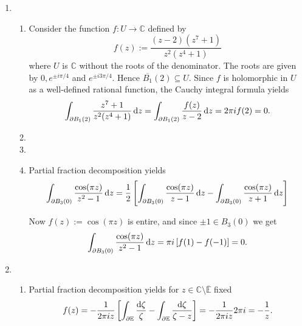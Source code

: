 \begin{enumerate}[label = \textbf{Exercise \arabic*.},wide = 0pt, itemsep=1.5ex]
\begin{proof}
			Using again proposition \ref{prop:zentrierungslemma} we find
			\begin{equation}
				\int_{\partial R}\frac{\d \zeta}{\zeta - z} = 2\pi i.
				\label{eq:int}
			\end{equation}
			Putting (\ref{eq:intg0}) and (\ref{eq:int}) together yields
			\begin{equation}
				0 = \int_{\partial R}g \d \zeta= \int_{\partial R} \frac{f(\zeta)}{\zeta - z} \d \zeta - f(z)\int_{\partial R}\frac{\d \zeta}{\zeta - z}= \int_{\partial R} \frac{f(\zeta)}{\zeta - z} \d \zeta - 2\pi i f(z).
			\end{equation}
		\end{proof}
	\item
		~
		\begin{enumerate}[label = (\roman*),wide = 0pt, itemsep=1.5ex]
			\item Consider the function $f: U \to \mathbb{C}$ defined by
				\begin{equation}
					f(z) := \frac{(z - 2)(z^7 + 1)}{z^2(z^4 + 1)}
				\end{equation}
				\noindent where $U$ is $\mathbb{C}$ without the roots of the denominator. The roots are given by $0,e^{\pm i\pi/4}$ and $e^{\pm i3\pi/4}$. Hence $\overline{B_1}(2) \subseteq U$. Since $f$ is holomorphic in $U$ as a well-defined rational function, the Cauchy integral formula yields
	\begin{equation}
		\int_{\partial B_1(2)}\frac{z^7 + 1}{z^2(z^4 + 1)}\mathop{}\!\mathrm{d} z = \int_{\partial B_1(2)} \frac{f(z)}{z - 2}\mathop{}\!\mathrm{d} z = 2\pi i f(2) = 0.
	\end{equation}
			\item 
			\item
			\item Partial fraction decomposition yields
				\begin{equation}
					\int_{\partial B_3(0)} \frac{\cos(\pi z)}{z^2 - 1}\d z = \frac{1}{2}\sbr{\int_{\partial B_3(0)}\frac{\cos(\pi z)}{z - 1}\d z - \int_{\partial B_3(0)}\frac{\cos(\pi z)}{z + 1}\d z}
				\end{equation}

				Now $f(z) := \cos(\pi z)$ is entire, and since $\pm 1 \in B_3(0)$ we get
				\begin{equation}
					\int_{\partial B_3(0)} \frac{\cos(\pi z)}{z^2 - 1}\d z = \pi i \sbr[0]{f(1) - f(-1)} = 0.
				\end{equation}
		\end{enumerate}
	\item
		~
		\begin{enumerate}[label = (\alph*),wide = 0pt, itemsep=1.5ex]
			\item Partial fraction decomposition yields for $z\in \mathbb{C} \setminus \overline{\mathbb{E}}$ fixed
				\begin{equation}
					f(z) = -\frac{1}{2\pi i z} \sbr{\int_{\partial \mathbb{E}} \frac{\d \zeta}{\zeta} - \int_{\partial \mathbb{E}}\frac{\d \zeta}{\zeta - z}} = -\frac{1}{2\pi i z}2\pi i = -\frac{1}{z}.
				\end{equation}


\end{enumerate}
\end{enumerate}
